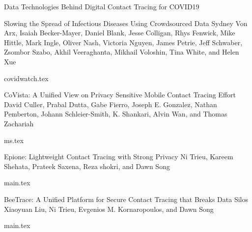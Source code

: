 \documentclass[11pt]{article}
\begin{document}
\begin{bulletin}
\begin{articlesection}{Data Technologies Behind Digital Contact Tracing for COVID19}
\makeatletter
\renewcommand{\AB@affillist}{}
\renewcommand{\AB@authlist}{}
\setcounter{authors}{0}
\makeatother

\begin{article}
{Slowing the Spread of Infectious Diseases Using Crowdsourced Data}
{Sydney Von Arx, Isaiah Becker-Mayer, Daniel Blank, Jesse Colligan, Rhys Fenwick, Mike Hittle, Mark Ingle, Oliver Nash, Victoria Nguyen, James Petrie, Jeff Schwaber, Zsombor Szabo, Akhil Veeraghanta, Mikhail Voloshin, Tina White, and Helen Xue}
\graphicspath{{submissions/covidwatch/}}
{covidwatch.tex}
\end{article}


\makeatletter
\renewcommand{\AB@affillist}{}
\renewcommand{\AB@authlist}{}
\setcounter{authors}{0}
\makeatother

\begin{article}
{CoVista: A Unified View on Privacy Sensitive Mobile Contact Tracing Effort}
{David Culler, Prabal Dutta, Gabe Fierro, Joseph E. Gonzalez, Nathan Pemberton, Johann Schleier-Smith, K. Shankari, Alvin Wan, and Thomas Zachariah}
\graphicspath{{submissions/BerkeleyCovista/figs/}}
{ms.tex}
\end{article}


\makeatletter
\renewcommand{\AB@affillist}{}
\renewcommand{\AB@authlist}{}
\setcounter{authors}{0}
\makeatother

\begin{article}
{Epione: Lightweight  Contact Tracing with Strong Privacy}
{Ni Trieu, Kareem Shehata, Prateek Saxena, Reza shokri, and Dawn Song}
\graphicspath{{submissions/Epione/figs/}}
{main.tex}
\end{article}


\makeatletter
\renewcommand{\AB@affillist}{}
\renewcommand{\AB@authlist}{}
\setcounter{authors}{0}
\makeatother

\begin{article}
{BeeTrace: A Unified Platform for Secure Contact Tracing that Breaks Data Silos}
{Xiaoyuan Liu, Ni Trieu, Evgenios M. Kornaropoulos, and Dawn Song}
\graphicspath{{submissions/BeeTrace/figs/}}
{main.tex}
\end{article}



\end{articlesection}
\end{bulletin}
\end{document}
